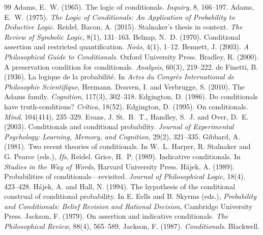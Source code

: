 \documentclass{situationist-preprint}
\begin{document}
\begin{thebibliography}{99}\small
{} Adams, E.~W. (1965). The logic of conditionals. \emph{Inquiry}, 8, 166--197.
 Adams, E.~W. (1975). \emph{The Logic of Conditionals: An Application of Probability to Deductive Logic}. Reidel.
 Bacon, A. (2015). Stalnaker's thesis in context. \emph{The Review of Symbolic Logic}, 8(1), 131--163.
 Belnap, N.~D. (1970). Conditional assertion and restricted quantification. \emph{No\^us}, 4(1), 1--12.
 Bennett, J. (2003). \emph{A Philosophical Guide to Conditionals}. Oxford University Press.
 Bradley, R. (2000). A preservation condition for conditionals. \emph{Analysis}, 60(3), 219--222.
 de Finetti, B. (1936). La logique de la probabilit\'e. In \emph{Actes du Congr\`es International de Philosophie Scientifique}, Hermann.
 Douven, I. and Verbrugge, S. (2010). The Adams family. \emph{Cognition}, 117(3), 302--318.
 Edgington, D. (1986). Do conditionals have truth-conditions? \emph{Cr\'itica}, 18(52).
 Edgington, D. (1995). On conditionals. \emph{Mind}, 104(414), 235--329.
 Evans, J. St.~B.~T., Handley, S.~J. and Over, D.~E. (2003). Conditionals and conditional probability. \emph{Journal of Experimental Psychology: Learning, Memory, and Cognition}, 29(2), 321--335.
 Gibbard, A. (1981). Two recent theories of conditionals. In W.~L. Harper, R. Stalnaker and G. Pearce (eds.), \emph{Ifs}, Reidel.
 Grice, H.~P. (1989). Indicative conditionals. In \emph{Studies in the Way of Words}, Harvard University Press.
 H\'ajek, A. (1989). Probabilities of conditionals---revisited. \emph{Journal of Philosophical Logic}, 18(4), 423--428.
 H\'ajek, A. and Hall, N. (1994). The hypothesis of the conditional construal of conditional probability. In E. Eells and B. Skyrms (eds.), \emph{Probability and Conditionals: Belief Revision and Rational Decision}, Cambridge University Press.
 Jackson, F. (1979). On assertion and indicative conditionals. \emph{The Philosophical Review}, 88(4), 565--589.
 Jackson, F. (1987). \emph{Conditionals}. Blackwell.

\end{thebibliography}
\end{document}

